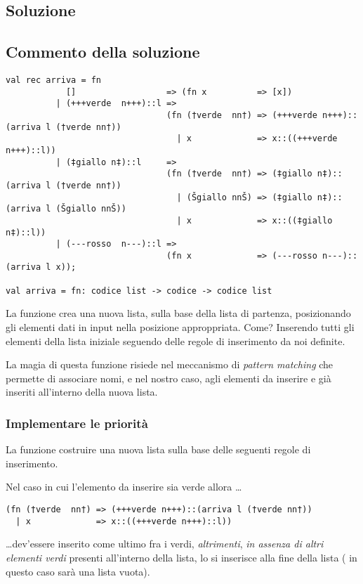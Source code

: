\subsection{Soluzione}



\subsection{Commento della soluzione}

\begin{lstlisting}[style = SML]
val rec arriva = fn
		    []			  		=> (fn x		  => [x])
		  | (+++verde  n+++)::l =>
		  						(fn (†verde  nn†) => (+++verde n+++)::(arriva l (†verde nn†))
								  | x			  => x::((+++verde n+++)::l))
		  | (‡giallo n‡)::l		=>
		  						(fn (†verde  nn†) => (‡giallo n‡)::(arriva l (†verde nn†))
		  						  | (Šgiallo nnŠ) => (‡giallo n‡)::(arriva l (Šgiallo nnŠ))
								  | x			  => x::((‡giallo n‡)::l))
		  | (---rosso  n---)::l =>
		  						(fn x			  => (---rosso n---)::(arriva l x));

val arriva = fn: codice list -> codice -> codice list
\end{lstlisting}

La funzione  crea una nuova lista, sulla base della lista di partenza, posizionando gli elementi dati in input nella posizione approppriata. %
Come? Inserendo tutti gli elementi della lista iniziale seguendo delle regole di inserimento da noi definite.

La magia di questa funzione risiede nel meccanismo di \emph{pattern matching} che permette di associare nomi,  e  nel nostro caso, agli elementi da inserire e già inseriti all'interno della nuova lista.

\subsubsection{Implementare le priorità}

La funzione  costruire una nuova lista sulla base delle seguenti regole di inserimento.

\medskip
Nel caso in cui l'elemento da inserire sia verde  allora \sml{=>} \dots
\begin{lstlisting}[style = SML, frame = none]
(fn (†verde  nn†) => (+++verde n+++)::(arriva l (†verde nn†))
  | x			  => x::((+++verde n+++)::l))
\end{lstlisting}
\dots dev'essere inserito come ultimo fra i verdi, \emph{altrimenti}, \emph{in assenza di altri elementi verdi} presenti all'interno della lista, lo si inserisce alla fine della lista %
( in questo caso sarà una lista vuota).

